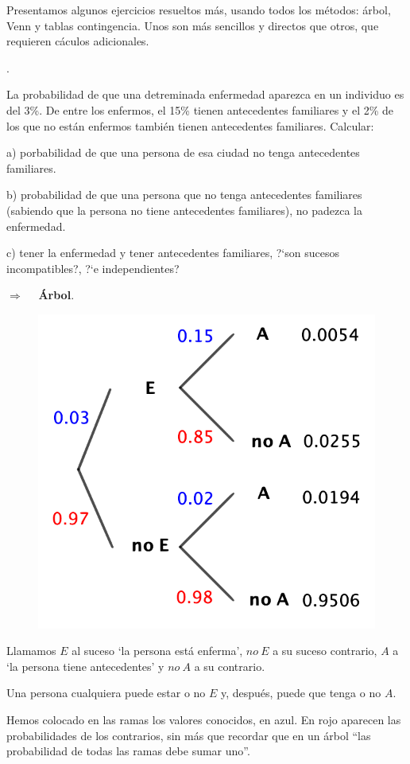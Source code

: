 Presentamos algunos ejercicios resueltos más, usando todos los métodos: árbol, Venn y tablas contingencia. Unos son más sencillos y directos que otros, que requieren cáculos adicionales.

\begin{example}
. \begin{ejre}
	La probabilidad de que una detreminada enfermedad aparezca en un individuo es del 3\%. De entre los enfermos, el 15\% tienen antecedentes familiares y el 2\% de los que no están enfermos también tienen antecedentes familiares. Calcular:
	
	\vspace{2mm} a) porbabilidad de que una persona de esa ciudad no tenga antecedentes familiares.
	
	\vspace{2mm} b) probabilidad de que una persona que no tenga antecedentes familiares \textcolor{gris}{(sabiendo que la persona no tiene antecedentes familiares)}, no padezca la enfermedad.
	
	\vspace{2mm} c) tener la enfermedad y tener antecedentes familiares, ?`son sucesos incompatibles?, ?`e independientes?

\vspace{4mm} $\boldsymbol{\Rightarrow}\quad $ \textbf{Árbol}.
	
\begin{multicols}{2}
	\begin{figure}[H]
			\centering
			\includegraphics[width=.5\textwidth]{imagenes/imagenes02/T02IM24.png}
	\end{figure}
	Llamamos $E$ al suceso `la persona está enferma', $no\ E$ a su suceso contrario, $A$ a `la persona tiene antecedentes' y $no\ A$ a su contrario.
	
	Una persona cualquiera puede estar o no $E$ y, después, puede que tenga  o no $A$.
	
	Hemos colocado en las ramas los valores conocidos, en azul. En rojo aparecen las probabilidades de los contrarios, sin más que recordar que en un árbol ``las probabilidad de todas las ramas debe sumar uno''.
\end{multicols}		
	

\end{ejre}
\end{example}
